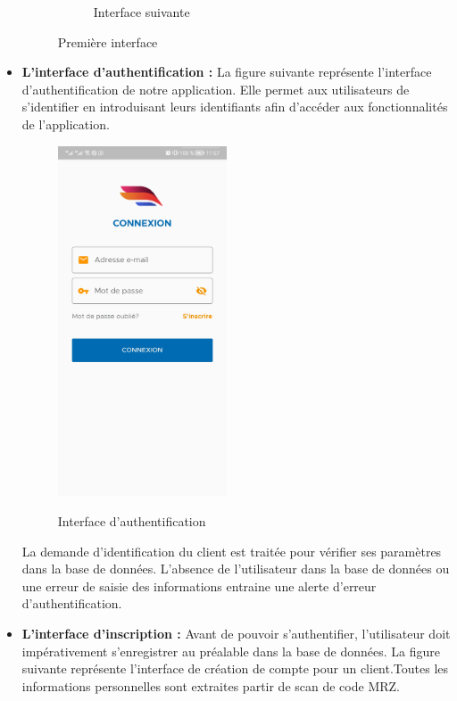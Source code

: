 \begin{itemize}[label=$\ast$]
\begin{figure}[!ht]
\begin{subfigure}{0.3\textwidth}
					\caption{Interface suivante}
					\label{fig.painel_sicapi}
				\end{subfigure}
				\caption{Première interface}
				\label{fig.sicapi}
			\end{figure}
		\newpage
		\item \textbf{L’interface
			d’authentification
			:} La figure suivante représente l’interface d’authentification de notre application. Elle permet aux utilisateurs de s’identifier en introduisant leurs identifiants afin d’accéder aux fonctionnalités de l’application.
			\begin{figure}%
				\centering
				{{\includegraphics[width=5cm]{./Template LaTeX/Images/3.jpg} }}%
				\caption{Interface d'authentification}%
				\label{fig:example}%
			\end{figure}
		\newpage
		La demande d’identification du client est traitée pour vérifier ses paramètres dans la base de
		données. L’absence de l’utilisateur dans la base de données ou une erreur de saisie des
		informations entraine une alerte d’erreur d’authentification.\newline
		\item \textbf{L’interface d’inscription :}
		Avant de pouvoir s’authentifier, l’utilisateur doit
		impérativement s’enregistrer au préalable dans la base de données. La figure suivante
		représente l’interface de création de compte pour un client.Toutes les informations personnelles sont extraites partir de scan de code MRZ.
		\begin{figure}[!ht]

\end{figure}
\end{itemize}
